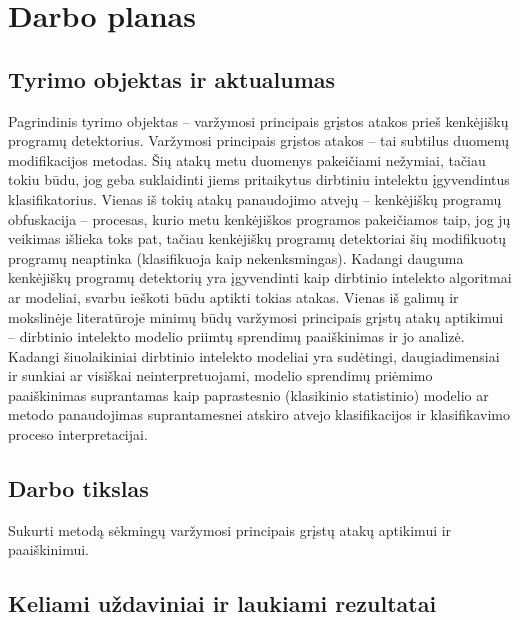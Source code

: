 \section{Darbo planas}

\subsection{Tyrimo objektas ir aktualumas}

Pagrindinis tyrimo objektas -- varžymosi principais grįstos atakos prieš
kenkėjiškų programų detektorius. Varžymosi principais grįstos atakos -- tai subtilus duomenų modifikacijos metodas. Šių atakų metu duomenys pakeičiami nežymiai, tačiau tokiu būdu, jog geba suklaidinti jiems pritaikytus dirbtiniu intelektu įgyvendintus klasifikatorius. Vienas iš tokių atakų panaudojimo atvejų -- kenkėjiškų programų obfuskacija -- procesas, kurio metu kenkėjiškos programos pakeičiamos taip, jog jų veikimas išlieka toks pat, tačiau kenkėjiškų programų detektoriai šių modifikuotų programų neaptinka (klasifikuoja kaip nekenksmingas). Kadangi dauguma kenkėjiškų programų detektorių yra įgyvendinti kaip dirbtinio intelekto algoritmai ar modeliai, svarbu ieškoti būdu aptikti tokias atakas. Vienas iš galimų ir mokslinėje literatūroje minimų būdų varžymosi principais grįstų atakų aptikimui -- dirbtinio intelekto modelio priimtų sprendimų paaiškinimas ir jo analizė. Kadangi šiuolaikiniai dirbtinio intelekto modeliai yra sudėtingi, daugiadimensiai ir sunkiai ar visiškai neinterpretuojami, modelio sprendimų priėmimo paaiškinimas suprantamas kaip paprastesnio (klasikinio statistinio) modelio ar metodo panaudojimas suprantamesnei atskiro atvejo klasifikacijos ir klasifikavimo proceso interpretacijai.

\subsection{Darbo tikslas}

Sukurti metodą sėkmingų varžymosi principais grįstų atakų aptikimui ir
paaiškinimui.

\subsection{Keliami uždaviniai ir laukiami rezultatai}

